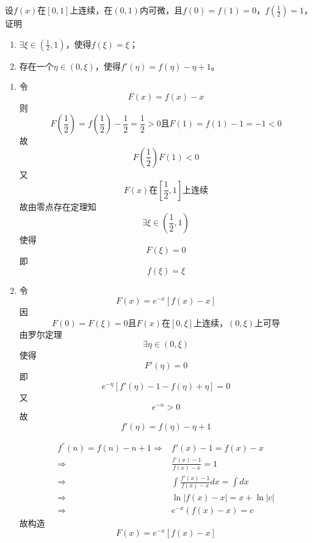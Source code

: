 \begin{example}
	设$f(x)$在$[0,1]$上连续，在$(0,1)$内可微，且$f(0)=f(1)=0$，$f(\frac{1}{2})=1$，证明
	\begin{enumerate}
		\item $\exists\xi\in(\frac{1}{2},1)$，使得$f(\xi)=\xi$；
		\item 存在一个$\eta\in(0,\xi)$，使得$f'(\eta)=f(\eta)-\eta+1$。
	\end{enumerate}
\end{example}
	\begin{newproof}
		\begin{enumerate}
			\item
			令\[F\left( x \right) =f\left( x \right) -x\]
			则\[
				F\left( \frac{1}{2} \right) =f\left( \frac{1}{2} \right) -\frac{1}{2}=\frac{1}{2}>0\text{且}F\left( 1 \right) =f\left( 1 \right) -1=-1<0
				\]
			故\[
				F\left( \frac{1}{2} \right) F\left( 1 \right) <0
				\]
			又\[
				F\left( x \right) \text{在}\left[ \frac{1}{2},1 \right] \text{上连续}
				\]
			故由零点存在定理知	\[
				\exists \xi \in \left( \frac{1}{2},1 \right) 
				\]
			使得\[
				F\left( \xi \right) =0
				\]
			即\[
				f\left( \xi \right) =\xi 
				\]
			\item	
			令\[F\left( x \right) =e^{-x}\left[ f\left( x \right) -x \right] \]
			因\[F\left( 0 \right) =F\left( \xi \right) =0\text{且}F\left( x \right) \text{在}\left[ 0,\xi \right] \text{上连续，}\left( 0,\xi \right) \text{上可导}\]	
			由罗尔定理\[\exists \eta \in \left( 0,\xi \right) \]
			使得\[F'\left( \eta \right) =0\]
			即\[e^{-\eta}\left[ f'\left( \eta \right) -1-f\left( \eta \right) +\eta \right] =0\]
			又\[e^{-n}>0\]
			故\[f'\left( \eta \right) =f\left( \eta \right) -\eta +1\]
			\begin{note}
				\begin{align*}
					f^{''}\left( n \right) =f\left( n \right) -n+1
					\Longrightarrow {}&
					f'\left( x \right) -1=f\left( x \right) -x\\
					\Longrightarrow {}&
					\frac{f'\left( x \right) -1}{f\left( x \right) -x}=1\\
					\Longrightarrow {}&
					\int{\frac{f'\left( x \right) -1}{f\left( x \right) -x}dx=\int{dx}}\\
					\Longrightarrow {}&
					\ln \left| f\left( x \right) -x \right|=x+\ln \left| c \right|\\
					\Longrightarrow {}&
					e^{-x}\left( f\left( x \right) -x \right) =c
				\end{align*}
				故构造\[F\left( x \right) =e^{-x}\left[ f\left( x \right) -x \right] \]
			\end{note}	
				
		\end{enumerate}
	\end{newproof}

